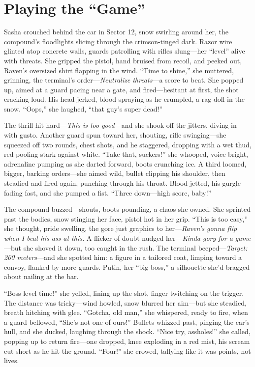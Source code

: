 \documentclass[12pt]{book}
\begin{document}
\section{Playing the ``Game''}

Sasha crouched behind the car in Sector 12, snow swirling around her, the compound’s floodlights slicing through the crimson-tinged dark. Razor wire glinted atop concrete walls, guards patrolling with rifles slung—her “level” alive with threats. She gripped the pistol, hand bruised from recoil, and peeked out, Raven’s oversized shirt flapping in the wind. “Time to shine,” she muttered, grinning, the terminal’s order—\textit{Neutralize threats}—a score to beat. She popped up, aimed at a guard pacing near a gate, and fired—hesitant at first, the shot cracking loud. His head jerked, blood spraying as he crumpled, a rag doll in the snow. “Oops,” she laughed, “that guy’s super dead!”

The thrill hit hard—\textit{This is too good}—and she shook off the jitters, diving in with gusto. Another guard spun toward her, shouting, rifle swinging—she squeezed off two rounds, chest shots, and he staggered, dropping with a wet thud, red pooling stark against white. “Take that, suckers!” she whooped, voice bright, adrenaline pumping as she darted forward, boots crunching ice. A third loomed, bigger, barking orders—she aimed wild, bullet clipping his shoulder, then steadied and fired again, punching through his throat. Blood jetted, his gurgle fading fast, and she pumped a fist. “Three down—high score, baby!”

The compound buzzed—shouts, boots pounding, a chaos she owned. She sprinted past the bodies, snow stinging her face, pistol hot in her grip. “This is too easy,” she thought, pride swelling, the gore just graphics to her—\textit{Raven’s gonna flip when I beat his ass at this.} A flicker of doubt nudged her—\textit{Kinda gory for a game}—but she shoved it down, too caught in the rush. The terminal beeped—\textit{Target: 200 meters}—and she spotted him: a figure in a tailored coat, limping toward a convoy, flanked by more guards. Putin, her “big boss,” a silhouette she’d bragged about nailing at the bar.

“Boss level time!” she yelled, lining up the shot, finger twitching on the trigger. The distance was tricky—wind howled, snow blurred her aim—but she steadied, breath hitching with glee. “Gotcha, old man,” she whispered, ready to fire, when a guard bellowed, “She’s not one of ours!” Bullets whizzed past, pinging the car’s hull, and she ducked, laughing through the shock. “Nice try, assholes!” she called, popping up to return fire—one dropped, knee exploding in a red mist, his scream cut short as he hit the ground. “Four!” she crowed, tallying like it was points, not lives.
\end{document}
